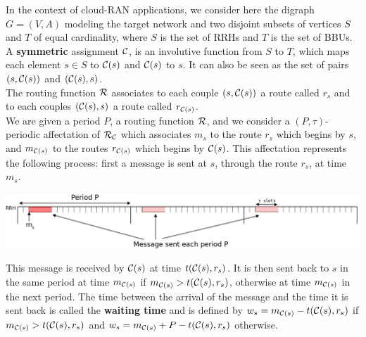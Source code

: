 \documentclass[a4paper,10pt]{article}
\begin{document}
      
      In the context of cloud-RAN applications, we consider here the digraph $G=(V,A)$ modeling the target network 
      and two disjoint subsets of vertices $S$ and $T$ of equal cardinality, where $S$ is the set of RRHs and $T$ is the set of BBUs. 
      A \textbf{symmetric} assignment ${\cal C}$, is an involutive function from $S$ to $T$, which maps each element $s\in S$ to ${\cal C}(s)$ and ${\cal C}(s)$ to $s$. It can also be seen as the set of pairs $(s,{\cal C}(s))$ and $({\cal C}(s),s)$.\\
      The routing function ${\cal R}$ associates to each couple $(s,{\cal C}(s))$ a route called $r_s$ and to each couples $({\cal C}(s),s)$ a route called $r_{{\cal C}(s)}$.\\     
       We are given a period $P$, a routing function ${\cal R}$, and we consider a $(P,\tau)$-periodic affectation of ${\cal R}_{\cal C}$ which associates $m_s$ to the route $r_s$ which begins by $s$, and $m_{{\cal C}(s)}$ to the routes $r_{{\cal C}(s)}$ which begins by ${\cal C}(s)$.  This affectation represents the following process: first a message is sent at $s$, through the route $r_s$, at time $m_s$.
      
%       
      
      
      \begin{center}
      \includegraphics[scale=0.3]{rrh.png}
      \end{center}
      
      

      This message is received by ${\cal C}(s)$ at time $t({\cal C}(s),r_s)$. It is then sent back to $s$ in the same period at time $m_{{\cal C}(s)}$ if $m_{{\cal C}(s)} > t({\cal C}(s),r_s)$, otherwise at time $m_{{\cal C}(s)}$ in the next period. The time between the arrival of the message and the time it is sent back is called the \textbf{waiting time} and is defined by $w_s = m_{{\cal C}(s)} - t({\cal C}(s),r_s)$ if $m_{{\cal C}(s)} > t({\cal C}(s),r_s)$ and $w_s = m_{{\cal C}(s)} + P - t({\cal C}(s),r_s)$ otherwise.
      
\end{document}
